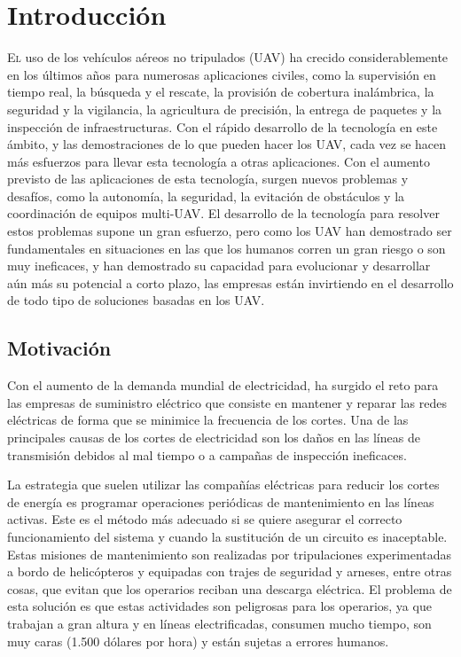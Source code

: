 \documentclass[fontsize=11pt, English=false, Español=true, Myfinal=true, twoside, numbers=noenddot]{scrbook}
\begin{document}
\chapter{Introducción}
\label{ch:Introduction}
\lettrine[lraise=-0.1, lines=2, loversize=0.2]{E}{l} uso de los vehículos aéreos no tripulados (\gls{UAV}) ha crecido considerablemente en los últimos años para numerosas aplicaciones civiles, como la supervisión en tiempo real, la búsqueda y el rescate, la provisión de cobertura inalámbrica, la seguridad y la vigilancia, la agricultura de precisión, la entrega de paquetes y la inspección de infraestructuras. Con el rápido desarrollo de la tecnología en este ámbito, y las demostraciones de lo que pueden hacer los \gls{UAV}, cada vez se hacen más esfuerzos para llevar esta tecnología a otras aplicaciones. Con el aumento previsto de las aplicaciones de esta tecnología, surgen nuevos problemas y desafíos, como la autonomía, la seguridad, la evitación de obstáculos y la coordinación de equipos multi-\gls{UAV}. El desarrollo de la tecnología para resolver estos problemas supone un gran esfuerzo, pero como los \gls{UAV} han demostrado ser fundamentales en situaciones en las que los humanos corren un gran riesgo o son muy ineficaces, y han demostrado su capacidad para evolucionar y desarrollar aún más su potencial a corto plazo, las empresas están invirtiendo en el desarrollo de todo tipo de soluciones basadas en los \gls{UAV}.


\section{Motivación}
\label{sec:Motivation}
Con el aumento de la demanda mundial de electricidad, ha surgido el reto para las empresas de suministro eléctrico que consiste en mantener y reparar las redes eléctricas de forma que se minimice la frecuencia de los cortes. Una de las principales causas de los cortes de electricidad son los daños en las líneas de transmisión debidos al mal tiempo o a campañas de inspección ineficaces.


La estrategia que suelen utilizar las compañías eléctricas para reducir los cortes de energía es programar operaciones periódicas de mantenimiento en las líneas activas. Este es el método más adecuado si se quiere asegurar el correcto funcionamiento del sistema y cuando la sustitución de un circuito es inaceptable. Estas misiones de mantenimiento son realizadas por tripulaciones experimentadas a bordo de helicópteros y equipadas con trajes de seguridad y arneses, entre otras cosas, que evitan que los operarios reciban una descarga eléctrica. El problema de esta solución es que estas actividades son peligrosas para los operarios, ya que trabajan a gran altura y en líneas electrificadas, consumen mucho tiempo, son muy caras (1.500 dólares por hora) y están sujetas a errores humanos.
\end{document}
